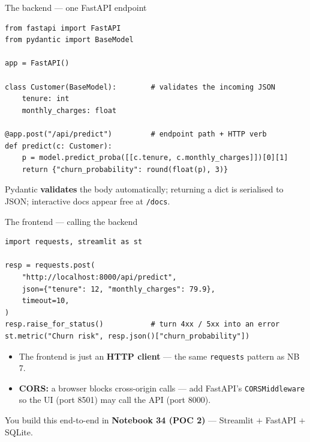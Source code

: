 \documentclass[aspectratio=169,11pt]{beamer}
\begin{document}
\begin{frame}[fragile]{The backend --- one FastAPI endpoint}
\begin{lstlisting}[style=py]
from fastapi import FastAPI
from pydantic import BaseModel

app = FastAPI()

class Customer(BaseModel):        # validates the incoming JSON
    tenure: int
    monthly_charges: float

@app.post("/api/predict")         # endpoint path + HTTP verb
def predict(c: Customer):
    p = model.predict_proba([[c.tenure, c.monthly_charges]])[0][1]
    return {"churn_probability": round(float(p), 3)}
\end{lstlisting}
  \vspace{-2pt}
  {\footnotesize Pydantic \textbf{validates} the body automatically; returning a dict is serialised to JSON; interactive docs appear free at \texttt{/docs}.}
\end{frame}

\begin{frame}[fragile]{The frontend --- calling the backend}
\begin{lstlisting}[style=py]
import requests, streamlit as st

resp = requests.post(
    "http://localhost:8000/api/predict",
    json={"tenure": 12, "monthly_charges": 79.9},
    timeout=10,
)
resp.raise_for_status()           # turn 4xx / 5xx into an error
st.metric("Churn risk", resp.json()["churn_probability"])
\end{lstlisting}
  \begin{itemize}
    \item The frontend is just an \textbf{HTTP client} --- the same \texttt{requests} pattern as NB 7.
    \item \textbf{CORS:} a browser blocks cross-origin calls --- add FastAPI's \texttt{CORSMiddleware} so the UI (port 8501) may call the API (port 8000).
  \end{itemize}
  {\footnotesize You build this end-to-end in \textbf{Notebook 34 (POC 2)} --- Streamlit $+$ FastAPI $+$ SQLite.}
\end{frame}

\end{document}

